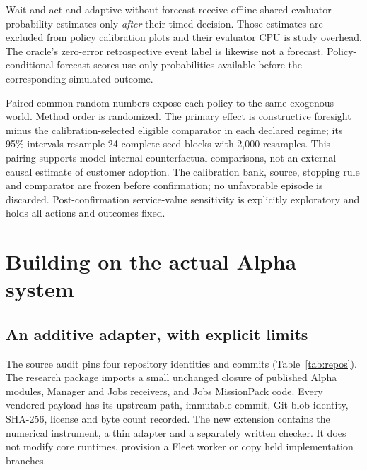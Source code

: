 \documentclass[11pt,a4paper]{article}
\begin{document}
Wait-and-act and adaptive-without-forecast receive offline shared-evaluator probability estimates only \emph{after} their timed decision. Those estimates are excluded from policy calibration plots and their evaluator CPU is study overhead. The oracle's zero-error retrospective event label is likewise not a forecast. Policy-conditional forecast scores use only probabilities available before the corresponding simulated outcome.

Paired common random numbers expose each policy to the same exogenous world. Method order is randomized. The primary effect is constructive foresight minus the calibration-selected eligible comparator in each declared regime; its 95\% intervals resample 24 complete seed blocks with 2,000 resamples. This pairing supports model-internal counterfactual comparisons, not an external causal estimate of customer adoption. \citep{rubin1974} The calibration bank, source, stopping rule and comparator are frozen before confirmation; no unfavorable episode is discarded. Post-confirmation service-value sensitivity is explicitly exploratory and holds all actions and outcomes fixed.

\section{Building on the actual Alpha system}
\subsection{An additive adapter, with explicit limits}
The source audit pins four repository identities and commits (Table~\ref{tab:repos}). The research package imports a small unchanged closure of published Alpha modules, Manager and Jobs receivers, and Jobs MissionPack code. Every vendored payload has its upstream path, immutable commit, Git blob identity, SHA-256, license and byte count recorded. The new extension contains the numerical instrument, a thin adapter and a separately written checker. It does not modify core runtimes, provision a Fleet worker or copy held implementation branches. \citep{alphaSource2026,managerSource2026,jobsSource2026,fleetSource2026}
\end{document}
